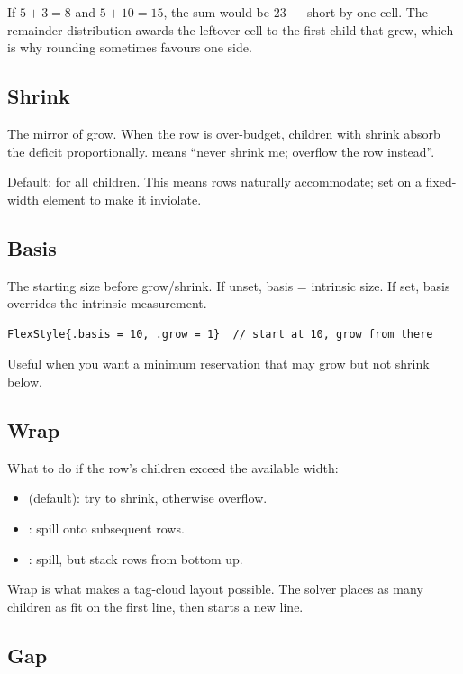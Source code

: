 If $5 + 3 = 8$ and $5 + 10 = 15$, the sum would be 23 ---
 short by one cell. The remainder distribution awards the
leftover cell to the first child that grew, which is why
rounding sometimes favours one side.

\subsection*{Shrink}

The mirror of grow. When the row is over-budget, children with
shrink absorb the deficit proportionally.  means
``never shrink me; overflow the row instead''.

Default:  for all children. This means rows
naturally accommodate; set  on a fixed-width
element to make it inviolate.

\subsection*{Basis}

The starting size before grow/shrink. If unset, basis = intrinsic
size. If set, basis overrides the intrinsic measurement.

\begin{lstlisting}
FlexStyle{.basis = 10, .grow = 1}  // start at 10, grow from there
\end{lstlisting}

Useful when you want a minimum reservation that may grow but not
shrink below.

\subsection*{Wrap}

What to do if the row's children exceed the available width:

\begin{itemize}[leftmargin=*]
  \item {} (default): try to shrink, otherwise overflow.
  \item {}: spill onto subsequent rows.
  \item {}: spill, but stack rows from bottom up.
\end{itemize}

Wrap is what makes a tag-cloud layout possible. The solver places
as many children as fit on the first line, then starts a new line.

\subsection*{Gap}

